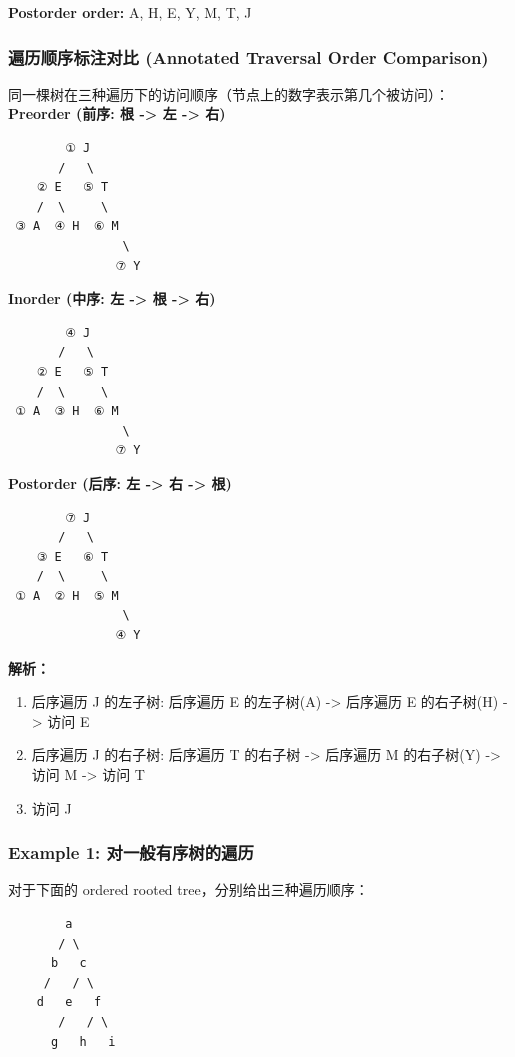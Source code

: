 \documentclass[10pt,a4paper,openany]{ctexbook}
\theoremstyle{definition}
\theoremstyle{remark}
\begin{document}
\textbf{Postorder order:} A, H, E, Y, M, T, J
\vspace{-2pt}

\subsubsection{遍历顺序标注对比 (Annotated Traversal Order Comparison)}

同一棵树在三种遍历下的访问顺序（节点上的数字表示第几个被访问）：
\textbf{Preorder (前序: 根 -> 左 -> 右)}
{\footnotesize\begin{verbatim}
        ① J
       /   \
    ② E   ⑤ T
    /  \     \
 ③ A  ④ H  ⑥ M
                \
               ⑦ Y
\end{verbatim}}

\textbf{Inorder (中序: 左 -> 根 -> 右)}
{\footnotesize\begin{verbatim}
        ④ J
       /   \
    ② E   ⑤ T
    /  \     \
 ① A  ③ H  ⑥ M
                \
               ⑦ Y
\end{verbatim}}

\textbf{Postorder (后序: 左 -> 右 -> 根)}
{\footnotesize\begin{verbatim}
        ⑦ J
       /   \
    ③ E   ⑥ T
    /  \     \
 ① A  ② H  ⑤ M
                \
               ④ Y
\end{verbatim}}

\textbf{解析：}
\begin{enumerate}
\item 后序遍历 J 的左子树: 后序遍历 E 的左子树(A) -> 后序遍历 E 的右子树(H) -> 访问 E
\item 后序遍历 J 的右子树: 后序遍历 T 的右子树 -> 后序遍历 M 的右子树(Y) -> 访问 M -> 访问 T
\item 访问 J

\end{enumerate}

\vspace{-2pt}

\subsubsection{Example 1: 对一般有序树的遍历}

对于下面的 ordered rooted tree，分别给出三种遍历顺序：
{\footnotesize\begin{verbatim}
        a
       / \
      b   c
     /   / \
    d   e   f
       /   / \
      g   h   i
\end{verbatim}}
\end{document}
